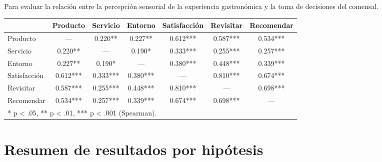 \documentclass[
  spanish,
]{article}
\begin{document}
Para evaluar la relación entre la percepción sensorial de la experiencia
gastronómica y la toma de decisiones del comensal.

\begin{table}[!h]
\centering\begingroup\fontsize{9}{11}\selectfont

\begin{tabular}{lcccccc}
\toprule
  & Producto & Servicio & Entorno & Satisfacción & Revisitar & Recomendar\\
\midrule
Producto & --- & 0.220** & 0.227** & 0.612*** & 0.587*** & 0.534***\\
Servicio & 0.220** & --- & 0.190* & 0.333*** & 0.255*** & 0.257***\\
Entorno & 0.227** & 0.190* & --- & 0.380*** & 0.448*** & 0.339***\\
Satisfacción & 0.612*** & 0.333*** & 0.380*** & --- & 0.810*** & 0.674***\\
Revisitar & 0.587*** & 0.255*** & 0.448*** & 0.810*** & --- & 0.698***\\
\addlinespace
Recomendar & 0.534*** & 0.257*** & 0.339*** & 0.674*** & 0.698*** & ---\\
\bottomrule
\multicolumn{7}{l}{\rule{0pt}{1em}* p < .05, ** p < .01, *** p < .001 (Spearman).}\\
\end{tabular}
\endgroup{}
\end{table}

\newpage

\section{Resumen de resultados por
hipótesis}\label{resumen-de-resultados-por-hipuxf3tesis}

\begingroup\fontsize{9}{11}\selectfont
\end{document}
